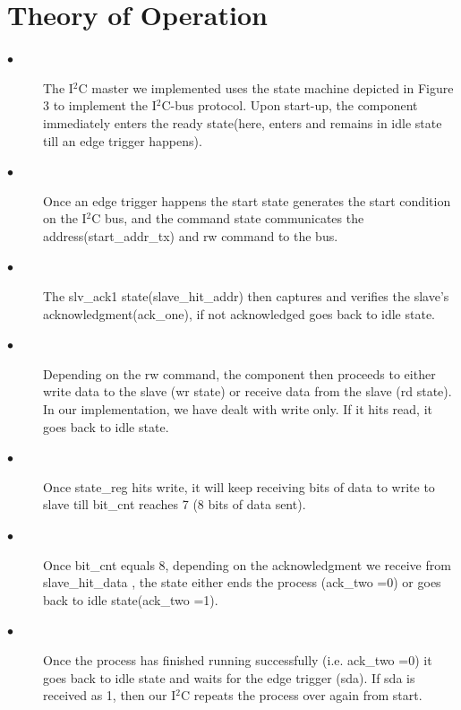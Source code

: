 \documentclass[12pt,twocolumn]{IEEEtran}
\begin{document}
  \section{Theory of Operation}
    \begin{description}
     
     \item[$\bullet$] The I$^{2}$C master we implemented uses the state machine depicted in Figure 3 to implement the I$^{2}$C-bus protocol. Upon start-up, the component immediately enters the ready state(here, enters and remains in idle state till an edge trigger happens). 

     \item[$\bullet$] Once an edge trigger happens the start state generates the start condition on the I$^{2}$C bus, and the command state communicates the address(start\_addr\_tx) and rw command to the bus. 

    \item[$\bullet$] The slv\_ack1 state(slave\_hit\_addr) then captures and verifies the slave’s acknowledgment(ack\_one), if not acknowledged goes back to idle state. 

    \item[$\bullet$]Depending on the rw command, the component then proceeds to either write data to the slave (wr state) or receive data from the slave (rd state). 
    In our implementation, we have dealt with write only. If it hits read, it goes back to idle state.

    \item[$\bullet$] Once state\_reg hits write, it will keep receiving bits of data to write to slave till bit\_cnt reaches 7 (8 bits of data sent).

    \item[$\bullet$] Once bit\_cnt equals 8, depending on the acknowledgment we receive from slave\_hit\_data , the state either ends the process (ack\_two =0) or goes back 
    to idle state(ack\_two =1). 

    \item[$\bullet$] Once the process has finished running successfully (i.e. ack\_two =0) it goes back to idle state and waits for the edge trigger (sda). If sda is received 
    as 1, then our I$^{2}$C repeats the process over again from start.
    \end{description}
  
\end{document}
